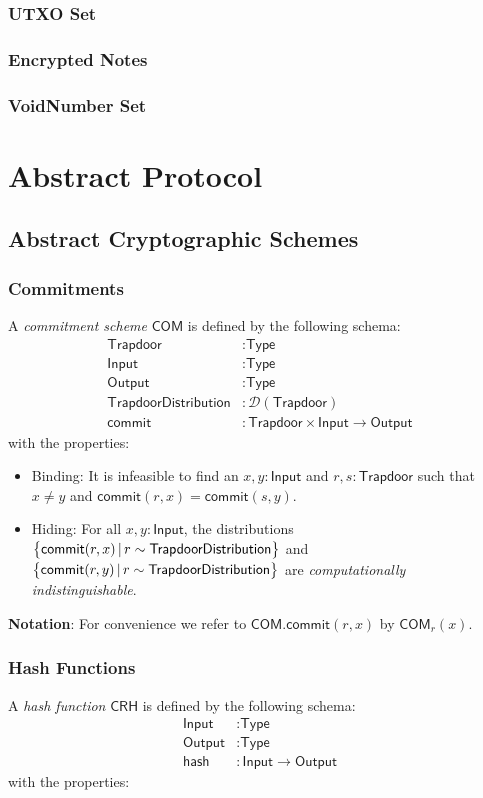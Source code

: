 \documentclass[a4paper]{article}
\newcommand{\lsection}[2]{\def\sectionlabel{#2} \section{#1}\label{sec:#2}}
\newcommand{\lsubsubsection}[2]{\def\sectionlabel{#2} \subsubsection{#1}\label{sec:#2}}
\newcommand{\COM}{{\textsf{COM}}}
\newcommand{\CRH}{{\textsf{CRH}}}
\newcommand{\Input}{{\textsf{Input}}}
\newcommand{\Output}{{\textsf{Output}}}
\newcommand{\TrapdoorDistribution}{{\textsf{TrapdoorDistribution}}}
\newcommand{\Trapdoor}{{\textsf{Trapdoor}}}
\newcommand{\Type}{{\textsf{Type}}}
\newcommand{\UTXO}{{\textsf{UTXO}}}
\newcommand{\VoidNumber}{{\textsf{VoidNumber}}}
\newcommand{\commit}{{\textsf{commit}}}
\newcommand{\hash}{{\textsf{hash}}}
\begin{document}
\lsubsubsection{\UTXO{} Set}{ledger-utxo-set}

\lsubsubsection{Encrypted Notes}{ledger-encrypted-notes}

\lsubsubsection{\VoidNumber{} Set}{ledger-void-number-set}

\lsection{Abstract Protocol}{abstract-protocol}

\subsection{Abstract Cryptographic Schemes}

\subsubsection{Commitments}

A \emph{commitment scheme} $\COM$ is defined by the following schema:
\begin{align*}
    \Trapdoor             &: \Type \\
    \Input                &: \Type \\
    \Output               &: \Type \\
    \TrapdoorDistribution &: \mathcal{D}(\Trapdoor) \\
    \commit               &: \Trapdoor \times \Input \to \Output
\end{align*}
with the properties:

\begin{itemize}
    \item Binding: It is infeasible to find an $x, y : \Input$ and $r, s: \Trapdoor$ such that $x \ne y$ and $\commit(r, x) = \commit(s, y)$.
    \item Hiding: For all $x, y : \Input$, the distributions $\set{\commit(r, x)\,|\,r \sim \TrapdoorDistribution}$ and \\ $\set{\commit(r, y)\,|\,r \sim \TrapdoorDistribution}$ are \emph{computationally indistinguishable}.
\end{itemize}

\textbf{Notation}: For convenience we refer to $\COM.\commit(r, x)$ by $\COM_r(x)$.

\subsubsection{Hash Functions}

A \emph{hash function} $\CRH$ is defined by the following schema:
\begin{align*}
    \Input  &: \Type \\
    \Output &: \Type \\
    \hash   &: \Input \to \Output
\end{align*}
with the properties:
\end{document}
